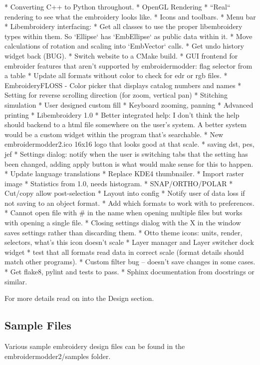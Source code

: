 \documentclass[a4paper]{report}
\begin{document}
* Converting C++ to Python throughout.
* OpenGL Rendering
  * ``Real`` rendering to see what the embroidery looks like.
  * Icons and toolbars.
  * Menu bar
* Libembroidery interfacing:
  * Get all classes to use the proper libembroidery types within them. So `Ellipse` has `EmbEllipse` as public data within it.
* Move calculations of rotation and scaling into `EmbVector` calls.
* Get undo history widget back (BUG).
* Switch website to a CMake build.
* GUI frontend for embroider features that aren't supported by embroidermodder: flag selector from a table
* Update all formats without color to check for edr or rgb files.
* EmbroideryFLOSS - Color picker that displays catalog numbers and names
* Setting for reverse scrolling direction (for zoom, vertical pan)
* Stitching simulation
* User designed custom fill
* Keyboard zooming, panning
* Advanced printing
* Libembroidery 1.0
* Better integrated help: I don't think the help should backend to a html file somewhere on the user's system. A better system would be a custom widget within the program that's searchable.
* New embroidermodder2.ico 16x16 logo that looks good at that scale.
* saving dst, pes, jef
* Settings dialog: notify when the user is switching tabs that the setting has been changed, adding apply button is what would make sense for this to happen.
* Update language translations
* Replace KDE4 thumbnailer.
* Import raster image
* Statistics from 1.0, needs histogram.
* SNAP/ORTHO/POLAR
* Cut/copy allow post-selection
* Layout into config
* Notify user of data loss if not saving to an object format.
* Add which formats to work with to preferences.
* Cannot open file with \# in the name when opening multiple files but works with opening a single file.
* Closing settings dialog with the X in the window saves settings rather than discarding them.
* Otto theme icons: units, render, selectors, what's this icon doesn't scale
* Layer manager and Layer switcher dock widget
* test that all formats read data in correct scale (format details should match other programs).
* Custom filter bug -- doesn't save changes in some cases.
* Get flake8, pylint and tests to pass.
* Sphinx documentation from docstrings or similar.

For more details read on into the Design section.

\subsection{Sample Files}

Various sample embroidery design files can be found in the embroidermodder2/samples folder.
\end{document}
